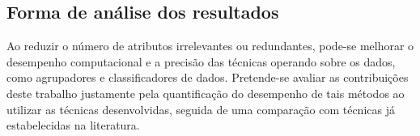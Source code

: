 
\subsection{Forma de análise dos resultados}

Ao reduzir o número de atributos irrelevantes ou redundantes, pode-se melhorar o desempenho computacional e a precisão das técnicas operando sobre os dados, como agrupadores e classificadores de dados. Pretende-se avaliar as contribuições deste trabalho justamente pela quantificação do desempenho de tais métodos ao utilizar as técnicas desenvolvidas, seguida de uma comparação com técnicas já estabelecidas na literatura.



\clearpage


